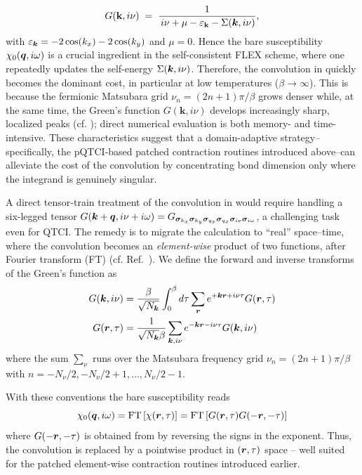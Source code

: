 \begin{equation}
  G(\mathbf{k}, i\nu)
  \;=\;
  \frac{1}
       {\,i\nu+\mu-\varepsilon_{\mathbf{k}}-\Sigma(\boldsymbol{k}, i\nu)},
       \label{eq:greenBubble}
\end{equation}
with $\varepsilon_{\boldsymbol{k}} = -2 \cos (k_x) - 2 \cos (k_y)$ and $\mu=0$. Hence the bare susceptibility $\chi_{0}(\boldsymbol{q}, i\omega)$ is a crucial ingredient in the self-consistent FLEX scheme, where one repeatedly updates the self-energy $\Sigma(\boldsymbol{k}, i\nu)$. Therefore, the convolution in  quickly becomes the dominant cost, in particular at low temperatures ($\beta \to \infty$). This is because the fermionic Matsubara grid \(\nu_n=(2n+1)\pi/\beta\) grows denser while, at the same time, the Green’s function $G(\mathbf{k}, i\nu)$ develops increasingly sharp, localized peaks (cf. ); direct numerical evaluation is both memory- and time-intensive. These characteristics suggest that a domain-adaptive strategy--specifically, the pQTCI-based patched contraction routines introduced above--can alleviate the cost of the convolution by concentrating bond dimension only where the integrand is genuinely singular.

A direct tensor‐train treatment of the convolution in  would require handling a six-legged tensor $G(\boldsymbol{k} + \boldsymbol{q}, i\nu + i\omega)=G_{\boldsymbol{\sigma}_{k_x}\boldsymbol{\sigma}_{k_y}\boldsymbol{\sigma}_{q_x}\boldsymbol{\sigma}_{q_x}\boldsymbol{\sigma}_{i\nu}\boldsymbol{\sigma}_{i\omega}}$, a challenging task even for QTCI. The remedy is to migrate the calculation to “real” space–time, where the
convolution becomes an \emph{element-wise} product of two functions, after Fourier transform (FT) (cf. Ref.~\cite{Rakhuba2015}).
We define the forward and inverse transforms of the Green’s function as
\begin{align}
     G(\boldsymbol{k}, i\nu) &=  \frac{\beta}{\sqrt{N_{\boldsymbol{k}}}}\int_{0}^{\beta} d\tau \sum_{\boldsymbol{r}} e^{+\boldsymbol{k}\boldsymbol{r}+i\nu\tau}  G(\boldsymbol{r}, \tau) 
     \label{eq:FTGreensFunc} 
     \\
    G(\boldsymbol{r}, \tau) &= \frac{1}{\sqrt{N_{\boldsymbol{k}}}\beta}\sum_{\boldsymbol{k},i\nu} e^{-\boldsymbol{k}\boldsymbol{r}-i\nu\tau} G(\boldsymbol{k}, i\nu) 
    \label{eq:invFTGreensFunc} 
\end{align}
where the sum $\sum_{\nu}$ runs over the Matsubara frequency grid \(\nu_n=(2n+1)\pi/\beta\) with $n=-N_{\nu}/2, -N_{\nu}/2+1, \dots, N_{\nu}/2-1$. 

With these conventions the bare susceptibility reads
\begin{equation}
    \chi_{0}(\boldsymbol{q}, i\omega) = \text{FT}\left[ \chi(\boldsymbol{r}, \tau) \right] = \text{FT}\left[ G(\boldsymbol{r}, \tau)G(-\boldsymbol{r}, -\tau)\right]
\end{equation}
where  $G(-\boldsymbol{r}, -\tau)$  is obtained from  by reversing the signs in the exponent. Thus, the convolution is replaced by a pointwise product in $(\boldsymbol{r}, \tau)$ space -- well suited for the patched element-wise contraction routines introduced earlier.

